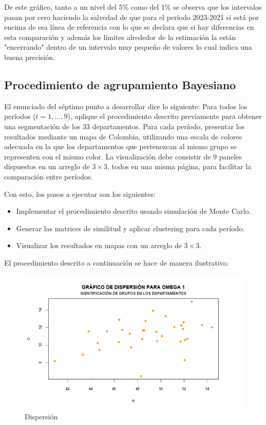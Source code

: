 \documentclass[12pt]{article}
\begin{document}
De este gráfico, tanto a un nivel del 5$\%$ como del 1$\%$ se observa que los intervalos pasan por cero haciendo la salvedad de que para el periodo 2023-2021 si está por encima de esa línea de referencia con lo que se declara que si hay diferencias en esta comparación y además los límites alrededor de la estimación la están "encerrando" dentro de un intervalo muy pequeño de valores lo cual indica una buena precisión. 

\subsection{Procedimiento de agrupamiento Bayesiano}

El enunciado del séptimo punto a desarrollar dice lo siguiente: Para todos los períodos ($t=1, \ldots, 9$), aplique el procedimiento descrito previamente para obtener una segmentación de los 33 departamentos. Para cada período, presentar los resultados mediante un mapa de Colombia, utilizando una escala de colores adecuada en la que los departamentos que pertenezcan al mismo grupo se representen con el mismo color. La visualización debe consistir de 9 paneles dispuestos en un arreglo de $3 \times 3$, todos en una misma página, para facilitar la comparación entre períodos.

Con esto, los pasos a ejecutar son los siguientes:

\begin{itemize}
    \item Implementar el procedimiento descrito usando simulación de Monte Carlo.
    \item Generar las matrices de similitud y aplicar clustering para cada período.
    \item Visualizar los resultados en mapas con un arreglo de $3 \times 3$.
\end{itemize}

El procedimiento descrito a continuación se hace de manera ilustrativa:

\begin{figure}[H]
    \centering
    \includegraphics[width=0.7\linewidth]{Imagenes/Dispercion1.png}
    \caption{Dispersión}
    \label{fig_enter_label}
\end{figure}
\end{document}
